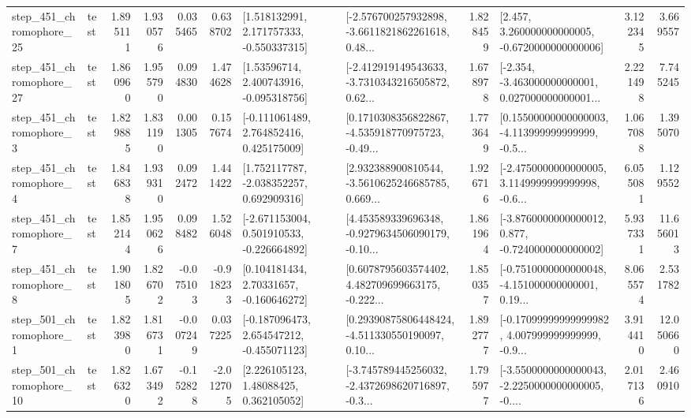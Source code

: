 \begin{tabular}{llrrrrllrlrr}
  step\_451\_chromophore\_25 &      test &      1.895111 &    1.930576 &      0.035465 &  0.638702 &    [1.518132991, 2.171757333, -0.550337315] &  [-2.576700257932898, -3.6611821862261618, 0.48... &       1.828459 &    [2.457, 3.260000000000005, -0.6720000000000006] &            3.122345 &          3.669557 \\
  step\_451\_chromophore\_27 &      test &      1.860960 &    1.955790 &      0.094830 &  1.474628 &     [1.53596714, 2.400743916, -0.095318756] &  [-2.412919149543633, -3.7310343216505872, 0.62... &       1.678978 &  [-2.354, -3.463000000000001, 0.027000000000001... &            2.221498 &          7.745245 \\
   step\_451\_chromophore\_3 &      test &      1.829885 &    1.831190 &      0.001305 &  0.157674 &    [-0.111061489, 2.764852416, 0.425175009] &  [0.1710308356822867, -4.535918770975723, -0.49... &       1.773649 &  [0.15500000000000003, -4.113999999999999, -0.5... &            1.067088 &          1.395070 \\
   step\_451\_chromophore\_4 &      test &      1.846838 &    1.939310 &      0.092472 &  1.441422 &    [1.752117787, -2.038352257, 0.692909316] &  [2.932388900810544, -3.5610625246685785, 0.669... &       1.926716 &  [-2.4750000000000005, 3.1149999999999998, -0.6... &            6.055081 &          1.129552 \\
   step\_451\_chromophore\_7 &      test &      1.852144 &    1.950626 &      0.098482 &  1.526048 &   [-2.671153004, 0.501910533, -0.226664892] &  [4.453589339696348, -0.9279634506090179, -0.10... &       1.861964 &  [-3.8760000000000012, 0.877, -0.7240000000000002] &            5.937331 &         11.656013 \\
   step\_451\_chromophore\_8 &      test &      1.901805 &    1.826702 &     -0.075103 & -0.918233 &     [0.104181434, 2.70331657, -0.160646272] &  [0.6078795603574402, 4.482709699663175, -0.222... &       1.850357 &  [-0.7510000000000048, -4.151000000000001, 0.19... &            8.065574 &          2.531782 \\
   step\_501\_chromophore\_1 &      test &      1.823980 &    1.816731 &     -0.007249 &  0.037225 &   [-0.187096473, 2.654547212, -0.455071123] &  [0.29390875806448424, -4.511330550190097, 0.10... &       1.892777 &  [-0.17099999999999982, 4.007999999999999, -0.9... &            3.914410 &         12.050660 \\
  step\_501\_chromophore\_10 &      test &      1.826320 &    1.673492 &     -0.152828 & -2.012705 &      [2.226105123, 1.48088425, 0.362105052] &  [-3.745789445256032, -2.4372698620716897, -0.3... &       1.795977 &  [-3.5500000000000043, -2.2250000000000005, -0.... &            2.017136 &          2.460910 \\

\end{tabular}
